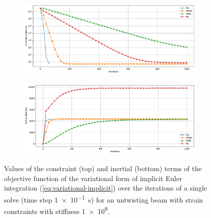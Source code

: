 \begin{figure}[t]
    \centering
    \begin{subfigure}{\textwidth}
        \includegraphics[width=\linewidth]{figures/strain_beam_untwist_constraintObjectives_large_ts.pdf}
    \end{subfigure}
    \begin{subfigure}{\textwidth}
        \includegraphics[width=\linewidth]{figures/strain_beam_untwist_inertialObjectives_large_ts.pdf}
    \end{subfigure}
    \caption{Values of the constraint (top) and inertial (bottom) terms of the objective function of the variational form of implicit Euler integration 
        (\cref{eq:variational-implicit}) over the iterations of a single solve (time step \SI{1e-1}{\second}) for an untwisting beam with strain 
    constraints with stiffness \num{1e9}.}
    \label{fig:strain-beam-untwist-objectives-split-large-ts}
\end{figure}

